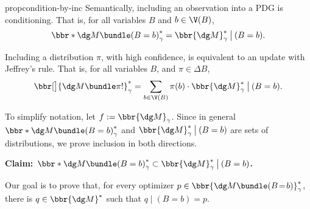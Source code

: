 \begin{linked}{prop}{condition-by-inc}
	Semantically, including an observation into a PDG is conditioning. That is, for all variables $B$ and $b \in \V(B)$,
	\[ \bbr*{\dg M \bundle (B = b)}_\gamma^* = \bbr{\dg M}_\gamma^* \mathbin{\big|} (B=b) . \]
\end{linked}

\begin{prop}\label{prop:jeffrey-by-inc}
	Including a distribution $\pi$, with high confidence, is equivalent to an update with Jeffrey's rule. That is, for all variables $B$, and $\pi \in \Delta B$,
	\[ \bbr[\big]{\dg M \bundle \pi!}_\gamma^* = \sum_{b \in \V(B)}
	 	\pi(b) \cdot \bbr{\dg M}_\gamma^* \mathbin{\big|} (B=b) . \]


\end{prop}

\begin{lproof}\label{proof:condition-by-inc}
	To simplify notation, let $f := \bbr{\dg M}_\gamma$. Since in general $\bbr*{\dg M \bundle (B = b)}_\gamma^*$ and $\bbr{\dg M}_\gamma^* \mathbin{\big|} (B=b)$ are sets of distributions, we prove inclusion in both directions.

		\textbf{Claim: $\bbr*{\dg M \bundle (B = b)}_\gamma^* \subset \bbr{\dg M}_\gamma^* \mathbin{\big|} (B=b)$.~}

	Our goal is to prove that, for every optimizer $p \in \bbr{\dg M \bundle (B\!=\!b)}^*_\gamma$, there is
	$q \in \bbr{\dg M}^*$ such that $q \mid (B\!=\!b) = p$.

\end{lproof}
